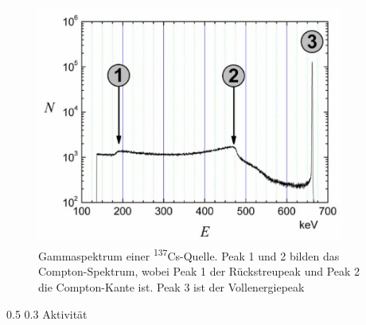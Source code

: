 \documentclass[german, %
parskip=full, %
bibliography=totoc, %
]{scrartcl}
\makeatletter
\renewcommand\subsection{\@startsection 
   {subsection}{2}{0mm}%
   {0.5\baselineskip}%
   {0.3\baselineskip}%
   {\bfseries\sffamily\large}%
   }
\makeatother
\begin{document}
\begin{figure}[ht] 
  \centering
     \includegraphics[width=0.9\textwidth]{gammaspektrum}
  \caption{Gammaspektrum einer \textsuperscript{137}Cs-Quelle. Peak 1 und 2 bilden das Compton-Spektrum, wobei Peak 1 der Rückstreupeak und Peak 2 die Compton-Kante ist. Peak 3 ist der Vollenergiepeak}
  \label{fig:gammaspektrum}
\end{figure}

\subsection{Aktivität}
\end{document}
